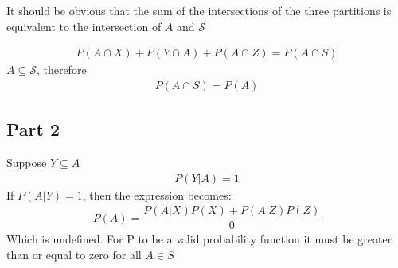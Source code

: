 \documentclass{article}
\begin{document}
It should be obvious that the sum of the intersections of the three partitions is equivalent to the intersection of $A$ and $\mathcal{S}$

\begin{align*}
P(A\cap X) + P(Y\cap A) + P(A\cap Z) = P(A\cap S)
\end{align*}
$A\subseteq \mathcal{S}$, therefore 
\begin{align*}
\boxed{P(A\cap S) = P(A)}
\end{align*}
\subsection*{Part 2}
Suppose $Y \subseteq A$
\begin{align*}
P(Y|A)= 1
\end{align*}
If $P(A|Y)= 1$, then the expression becomes:
\begin{align*}
P(A) = \dfrac{P(A|X)P(X)+P(A|Z)P(Z)}{0}
\end{align*}
Which is undefined. For P to be a valid probability function it must be greater than or equal to zero for all $A\in S$
\end{document}

